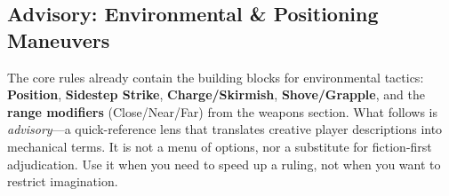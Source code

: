 \subsection{Advisory: Environmental \& Positioning Maneuvers}
\label{sec:env-maneuvers}

The core rules already contain the building blocks for environmental tactics: \textbf{Position}, \textbf{Sidestep Strike}, \textbf{Charge/Skirmish}, \textbf{Shove/Grapple}, and the \textbf{range modifiers} (Close/Near/Far) from the weapons section. What follows is \textit{advisory}---a quick-reference lens that translates creative player descriptions into mechanical terms. It is not a menu of options, nor a substitute for fiction-first adjudication. Use it when you need to speed up a ruling, not when you want to restrict imagination.

